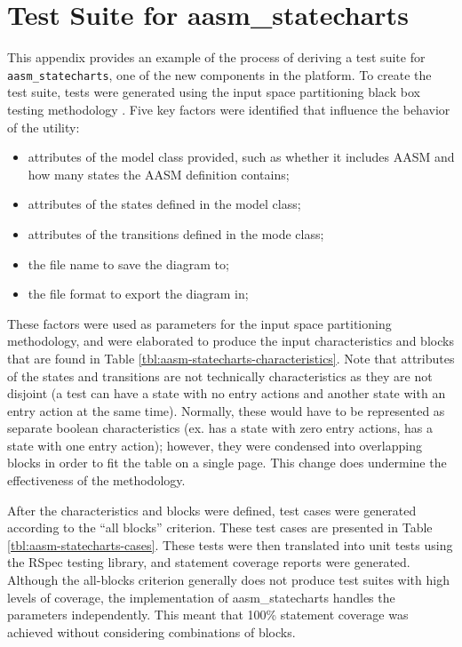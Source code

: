 \documentclass[document.tex]{subfiles}
\begin{document}
\chapter{Test Suite for aasm\_statecharts}
\label {ch:aasm-statecharts-test-cases}

\vspace{-\baselineskip}

This appendix provides an example of the process of deriving a test suite for \verb!aasm_statecharts!, one of the new components in the platform.
To create the test suite, tests were generated using the input space partitioning black box testing methodology \cite{offut}. Five key factors were identified that influence the behavior of the utility:

\begin{itemize}
\item attributes of the model class provided, such as whether it includes AASM and how many states the AASM definition contains;
\item attributes of the states defined in the model class;
\item attributes of the transitions defined in the mode class;
\item the file name to save the diagram to;
\item the file format to export the diagram in;
\end{itemize}

These factors were used as parameters for the input space partitioning methodology, and were elaborated to produce the input characteristics and blocks that are found in Table \ref{tbl:aasm-statecharts-characteristics}. Note that attributes of the states and transitions are not technically characteristics as they are not disjoint (a test can have a state with no entry actions and another state with an entry action at the same time). Normally, these would have to be represented as separate boolean characteristics (ex. has a state with zero entry actions, has a state with one entry action); however, they were condensed into overlapping blocks in order to fit the table on a single page. This change does undermine the effectiveness of the methodology.

After the characteristics and blocks were defined, test cases were generated according to the ``all blocks'' criterion. These test cases are presented in Table \ref{tbl:aasm-statecharts-cases}. These tests were then translated into unit tests using the RSpec \cite{rspec} testing library, and statement coverage reports were generated. Although the all-blocks criterion generally does not produce test suites with high levels of coverage, the implementation of aasm\_statecharts handles the parameters independently. This meant that 100\% statement coverage was achieved without considering combinations of blocks.
\end{document}

